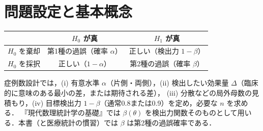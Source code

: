 \section{問題設定と基本概念}\label{sec:12-basic}
\begin{center}\small
\begin{tabular}{@{}lcc@{}}
\toprule
 & $H_0$ が真 & $H_1$ が真\\
\midrule
$H_0$ を棄却 & 第1種の過誤（確率 $\alpha$） & 正しい（検出力 $1-\beta$）\\
$H_0$ を採択 & 正しい（$1-\alpha$） & 第2種の過誤（確率 $\beta$）\\
\bottomrule
\end{tabular}
\end{center}
症例数設計では，(i) 有意水準 $\alpha$（片側・両側），(ii) 検出したい効果量 $\Delta$（臨床的に意味のある最小の差，または期待される差），
(iii) 分散などの局外母数の見積もり，(iv) 目標検出力 $1-\beta$（通常0.8または0.9）を定め，必要な $n$ を求める．
\Youchui 『現代数理統計学の基礎』では $\beta(\theta)$ を検出力関数そのものとして用いる．本書（と医療統計の慣習）では $\beta$ は第2種の過誤確率である．

